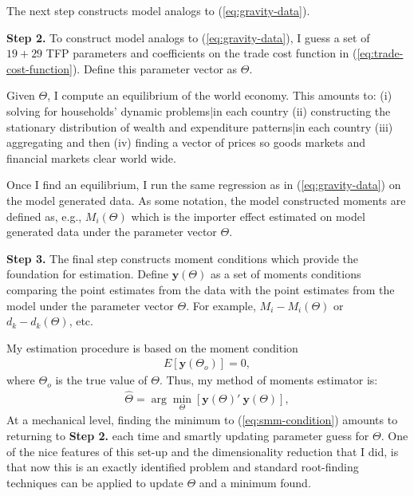 \documentclass[12pt,pdftex]{article}
\begin{document}
\begin{onehalfspacing}
The next step constructs model analogs to (\ref{eq:gravity-data}).

\textbf{Step 2.} To construct model analogs to (\ref{eq:gravity-data}), I guess a set of $19 + 29$ TFP parameters and coefficients on the trade cost function in (\ref{eq:trade-cost-function}). Define this parameter vector as $\Theta$.

Given $\Theta$, I compute an equilibrium of the world economy. This amounts to: (i) solving for households' dynamic problems|in each country (ii) constructing the stationary distribution of wealth and expenditure patterns|in each country (iii) aggregating and then (iv) finding a vector of prices so goods markets and financial markets clear world wide.

Once I find an equilibrium, I run the same regression as in (\ref{eq:gravity-data}) on the model generated data. As some notation, the model constructed moments are defined as, e.g., $M_{i}(\Theta)$ which is the importer effect estimated on model generated data under the parameter vector $\Theta$.

\textbf{Step 3.} The final step constructs moment conditions which provide the foundation for estimation. Define $\mathbf{y}(\Theta)$ as a set of moments conditions comparing the point estimates from the data with the point estimates from the model under the parameter vector $\Theta$. For example, ${M_{i}} - M_{i}(\Theta)$ or $d_k - d_k(\Theta)$, etc.

My estimation procedure is based on the moment condition
\begin{align}
E\left[\mathbf{y}(\Theta_o)\right] = 0,
\end{align}
where $\Theta_o$ is the true value of $\Theta$. Thus, my method of moments estimator is:
\begin{align}
\hat{\Theta} = \arg\min_{\Theta} \left[\mathbf{y}(\Theta)'\ \mathbf{y}(\Theta)\right], \label{eq:smm-condition}
\end{align}
At a mechanical level, finding the minimum to (\ref{eq:smm-condition}) amounts to returning to \textbf{Step 2.} each time and smartly updating parameter guess for $\Theta$. One of the nice features of this set-up and the dimensionality reduction that I did, is that now this is an exactly identified problem and standard root-finding techniques can be applied to update $\Theta$ and a minimum found.


\end{onehalfspacing}
\end{document}
